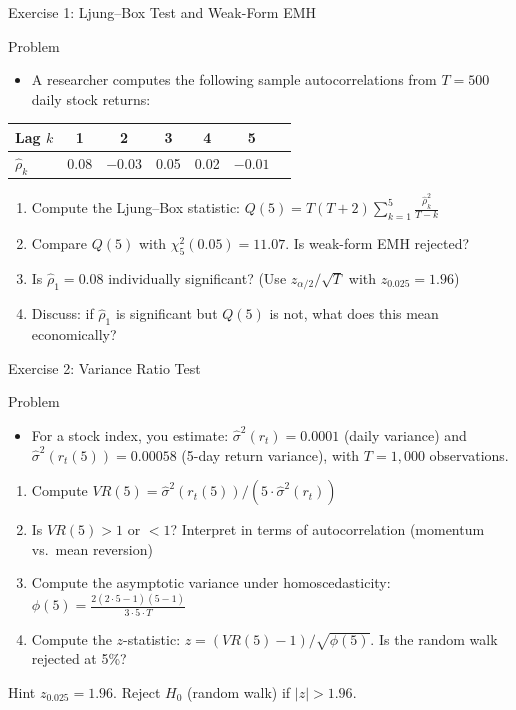 \documentclass[9pt, aspectratio=169, t]{beamer}
\theoremstyle{definition}
\begin{document}
\begin{frame}{Exercise 1: Ljung--Box Test and Weak-Form EMH}
\begin{block}{Problem}
\begin{itemize}
\item A researcher computes the following sample autocorrelations from $T = 500$ daily stock returns:
\end{itemize}
\begin{center}
{\small
\renewcommand{\arraystretch}{1.2}
\begin{tabular}{lcccccc}
\toprule
Lag $k$ & 1 & 2 & 3 & 4 & 5 \\
\midrule
$\hat{\rho}_k$ & 0.08 & $-0.03$ & 0.05 & 0.02 & $-0.01$ \\
\bottomrule
\end{tabular}
}
\end{center}
\end{block}
\begin{enumerate}
    \item Compute the Ljung--Box statistic: $Q(5) = T(T+2)\sum_{k=1}^{5}\frac{\hat{\rho}_k^2}{T-k}$
    \item Compare $Q(5)$ with $\chi^2_5(0.05) = 11.07$. Is weak-form EMH rejected?
    \item Is $\hat{\rho}_1 = 0.08$ individually significant? (Use $z_{\alpha/2}/\sqrt{T}$ with $z_{0.025} = 1.96$)
    \item Discuss: if $\hat{\rho}_1$ is significant but $Q(5)$ is not, what does this mean economically?
\end{enumerate}
\end{frame}

\begin{frame}{Exercise 2: Variance Ratio Test}
\begin{block}{Problem}
\begin{itemize}
\item For a stock index, you estimate: $\hat{\sigma}^2(r_t) = 0.0001$ (daily variance) and $\hat{\sigma}^2(r_t(5)) = 0.00058$ (5-day return variance), with $T = 1{,}000$ observations.
\end{itemize}
\end{block}
\begin{enumerate}
    \item Compute $VR(5) = \hat{\sigma}^2(r_t(5)) / (5 \cdot \hat{\sigma}^2(r_t))$
    \item Is $VR(5) > 1$ or $< 1$? Interpret in terms of autocorrelation (momentum vs.\ mean reversion)
    \item Compute the asymptotic variance under homoscedasticity: $\phi(5) = \frac{2(2 \cdot 5 - 1)(5 - 1)}{3 \cdot 5 \cdot T}$
    \item Compute the $z$-statistic: $z = (VR(5) - 1)/\sqrt{\phi(5)}$. Is the random walk rejected at 5\%?
\end{enumerate}
\vspace{0.1cm}
\begin{exampleblock}{Hint}
$z_{0.025} = 1.96$. Reject $H_0$ (random walk) if $|z| > 1.96$.
\end{exampleblock}
\end{frame}
\end{document}
